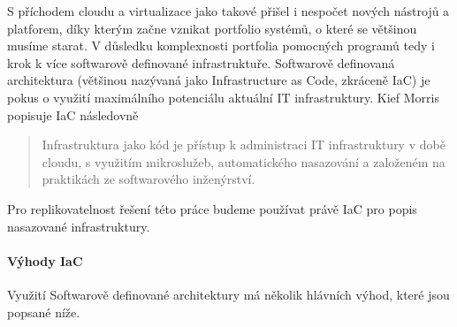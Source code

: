 \documentclass[thesis=M,czech]{FITthesis}[2019/12/23]
\theoremstyle{plain}
\theoremstyle{definition}
\begin{document}
S příchodem cloudu a virtualizace jako takové přišel i nespočet nových nástrojů a platforem, díky kterým začne vznikat portfolio systémů, o které se většinou musíme starat. V důsledku komplexnosti portfolia pomocných programů tedy i krok k více softwarově definované infrastruktuře. Softwarově definovaná architektura (většinou nazývaná jako Infrastructure as Code, zkráceně IaC) je pokus o využití maximálního potenciálu aktuální IT infrastruktury. Kief Morris \cite{kief-morris-iac} popisuje IaC následovně


\begin{quotation}
Infrastruktura jako kód je přístup k administraci IT infrastruktury v době cloudu, s využitím mikroslužeb, automatického nasazování a založeném na praktikách ze softwarového inženýrství.  
\end{quotation}

Pro replikovatelnost řešení této práce budeme používat právě IaC pro popis nasazované infrastruktury.

\paragraph{Výhody IaC}

Využití Softwarově definované architektury má několik hlávních výhod, které jsou popsané níže.
\end{document}
